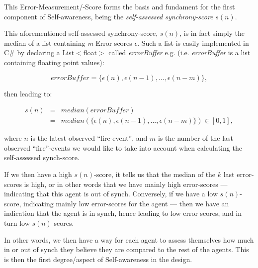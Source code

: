 			This Error-Measurement/-Score forms the basis and fundament for the first component of Self-awareness, being the \textit{self-assessed synchrony-score} $s(n)$.
			
			This aforementioned self-assessed synchrony-score, $s(n)$, is in fact simply the median of a list  containing \textit{m} Error-scores $\epsilon$. Such a list is easily implemented in C\# by declaring a List$<$float$>$ called \textit{errorBuffer} e.g. (i.e. \textit{errorBuffer} is a list containing floating point values):
			
			\begin{equation}
			\label{error_buffer}
				errorBuffer = \{\epsilon(n), \epsilon(n-1), ... , \epsilon(n-m)\},
			\end{equation} \nl
			
			then leading to:
			
			\begin{equation}
			\label{self_assessed_synch}
				\begin{array}{rrclcl}
				s(n) & = & median(errorBuffer) \\ 
				& = & median(\{\epsilon(n), \epsilon(n-1), ... , \epsilon(n-m)\}) \in [0, 1],
				\end{array}
			\end{equation} \nl
			
			where $n$ is the latest observed ``fire-event'', and $m$ is the number of the last observed ``fire''-events we would like to take into account when calculating the self-assessed synch-score.
			
			If we then have a high $s(n)$-score, it tells us that the median of the $k$ last error-scores is high, or in other words that we have mainly high error-scores — indicating that this agent is out of synch. Conversely, if we have a low $s(n)$-score, indicating mainly low error-scores for the agent — then we have an indication that the agent is in synch, hence leading to low error scores, and in turn low $s(n)$-scores. 
			
			In other words, we then have a way for each agent to assess themselves how much in or out of synch they believe they are compared to the rest of the agents. This is then the first degree/aspect of  Self-awareness in the design.
			
			
